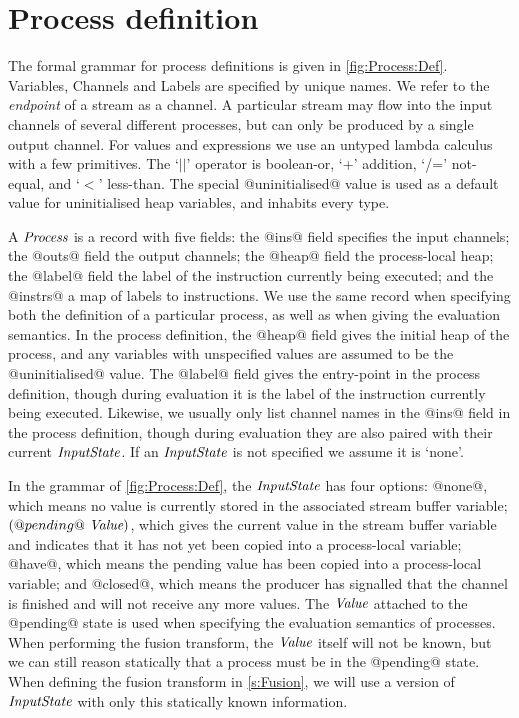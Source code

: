 \section{Process definition}
\label{kpn/process-definition}



The formal grammar for process definitions is given in \cref{fig:Process:Def}.
Variables, Channels and Labels are specified by unique names.
We refer to the \emph{endpoint} of a stream as a channel.
A particular stream may flow into the input channels of several different processes, but can only be produced by a single output channel.
For values and expressions we use an untyped lambda calculus with a few primitives.
The `$||$' operator is boolean-or, `+' addition, `/=' not-equal, and `$<$' less-than.
The special @uninitialised@ value is used as a default value for uninitialised heap variables, and inhabits every type.

A $\textit{Process}$ is a record with five fields: the @ins@ field specifies the input channels; the @outs@ field the output channels; the @heap@ field the process-local heap; the @label@ field the label of the instruction currently being executed; and the @instrs@ a map of labels to instructions.
We use the same record when specifying both the definition of a particular process, as well as when giving the evaluation semantics.
In the process definition, the @heap@ field gives the initial heap of the process, and any variables with unspecified values are assumed to be the @uninitialised@ value.
The @label@ field gives the entry-point in the process definition, though during evaluation it is the label of the instruction currently being executed.
Likewise, we usually only list channel names in the @ins@ field in the process definition, though during evaluation they are also paired with their current $\textit{InputState}$.
If an $\textit{InputState}$ is not specified we assume it is `none'.

In the grammar of \cref{fig:Process:Def}, the $\textit{InputState}$ has four options: @none@, which means no value is currently stored in the associated stream buffer variable; $(@pending@~\textit{Value})$, which gives the current value in the stream buffer variable and indicates that it has not yet been copied into a process-local variable; @have@, which means the pending value has been copied into a process-local variable; and @closed@, which means the producer has signalled that the channel is finished and will not receive any more values.
The $\textit{Value}$ attached to the @pending@ state is used when specifying the evaluation semantics of processes.
When performing the fusion transform, the $\textit{Value}$ itself will not be known, but we can still reason statically that a process must be in the @pending@ state.
When defining the fusion transform in \cref{s:Fusion}, we will use a version of $\textit{InputState}$ with only this statically known information.

